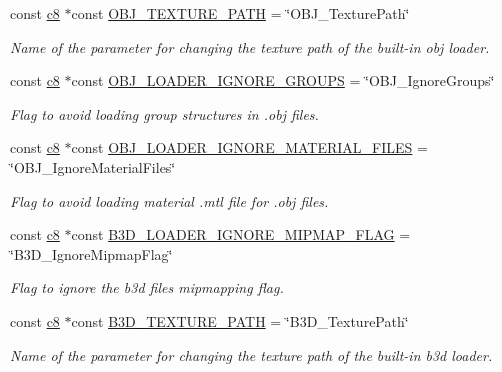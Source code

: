 \begin{DoxyCompactItemize}
const \hyperlink{namespaceirr_a9395eaea339bcb546b319e9c96bf7410}{c8} $\ast$const \hyperlink{namespaceirr_1_1scene_a9f673de5be36d1ea444d8a0c0861ca05}{O\+B\+J\+\_\+\+T\+E\+X\+T\+U\+R\+E\+\_\+\+P\+A\+TH} = \char`\"{}O\+B\+J\+\_\+\+Texture\+Path\char`\"{}
\begin{DoxyCompactList}\small\item\em Name of the parameter for changing the texture path of the built-\/in obj loader. \end{DoxyCompactList}\item 
const \hyperlink{namespaceirr_a9395eaea339bcb546b319e9c96bf7410}{c8} $\ast$const \hyperlink{namespaceirr_1_1scene_acdf95538086272945defdef3b8f5b6d6}{O\+B\+J\+\_\+\+L\+O\+A\+D\+E\+R\+\_\+\+I\+G\+N\+O\+R\+E\+\_\+\+G\+R\+O\+U\+PS} = \char`\"{}O\+B\+J\+\_\+\+Ignore\+Groups\char`\"{}
\begin{DoxyCompactList}\small\item\em Flag to avoid loading group structures in .obj files. \end{DoxyCompactList}\item 
const \hyperlink{namespaceirr_a9395eaea339bcb546b319e9c96bf7410}{c8} $\ast$const \hyperlink{namespaceirr_1_1scene_afa0b3bc0e55abdf926f09a7094c74de3}{O\+B\+J\+\_\+\+L\+O\+A\+D\+E\+R\+\_\+\+I\+G\+N\+O\+R\+E\+\_\+\+M\+A\+T\+E\+R\+I\+A\+L\+\_\+\+F\+I\+L\+ES} = \char`\"{}O\+B\+J\+\_\+\+Ignore\+Material\+Files\char`\"{}
\begin{DoxyCompactList}\small\item\em Flag to avoid loading material .mtl file for .obj files. \end{DoxyCompactList}\item 
const \hyperlink{namespaceirr_a9395eaea339bcb546b319e9c96bf7410}{c8} $\ast$const \hyperlink{namespaceirr_1_1scene_a8ffd431b36471ace9942d0693658076c}{B3\+D\+\_\+\+L\+O\+A\+D\+E\+R\+\_\+\+I\+G\+N\+O\+R\+E\+\_\+\+M\+I\+P\+M\+A\+P\+\_\+\+F\+L\+AG} = \char`\"{}B3\+D\+\_\+\+Ignore\+Mipmap\+Flag\char`\"{}
\begin{DoxyCompactList}\small\item\em Flag to ignore the b3d file\textquotesingle{}s mipmapping flag. \end{DoxyCompactList}\item 
const \hyperlink{namespaceirr_a9395eaea339bcb546b319e9c96bf7410}{c8} $\ast$const \hyperlink{namespaceirr_1_1scene_aa2ba7f6fbb42b33a21e4083a85772b1b}{B3\+D\+\_\+\+T\+E\+X\+T\+U\+R\+E\+\_\+\+P\+A\+TH} = \char`\"{}B3\+D\+\_\+\+Texture\+Path\char`\"{}
\begin{DoxyCompactList}\small\item\em Name of the parameter for changing the texture path of the built-\/in b3d loader. \end{DoxyCompactList}\item 

\end{DoxyCompactItemize}
